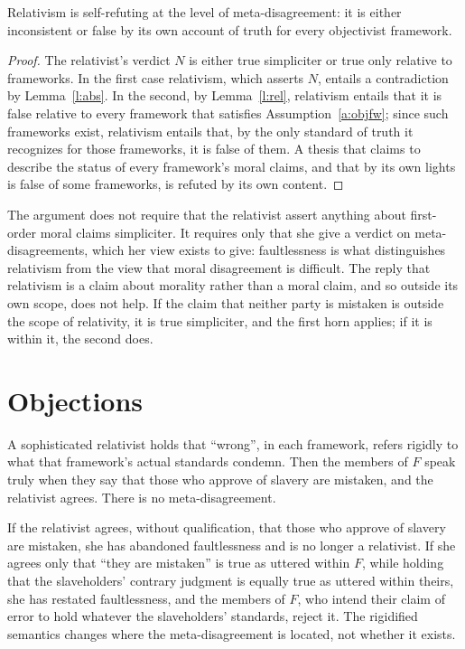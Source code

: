 \documentclass{situationist-preprint}
\begin{document}
\begin{theorem}\label{t:main}
Relativism is self-refuting at the level of meta-disagreement: it is either inconsistent or false by its own account of truth for every objectivist framework.
\end{theorem}

\begin{proof}
The relativist's verdict $N$ is either true simpliciter or true only relative to frameworks. In the first case relativism, which asserts $N$, entails a contradiction by Lemma~\ref{l:abs}. In the second, by Lemma~\ref{l:rel}, relativism entails that it is false relative to every framework that satisfies Assumption~\ref{a:objfw}; since such frameworks exist, relativism entails that, by the only standard of truth it recognizes for those frameworks, it is false of them. A thesis that claims to describe the status of every framework's moral claims, and that by its own lights is false of some frameworks, is refuted by its own content.
\end{proof}

The argument does not require that the relativist assert anything about first-order moral claims simpliciter. It requires only that she give a verdict on meta-disagreements, which her view exists to give: faultlessness is what distinguishes relativism from the view that moral disagreement is difficult. The reply that relativism is a claim about morality rather than a moral claim, and so outside its own scope, does not help. If the claim that neither party is mistaken is outside the scope of relativity, it is true simpliciter, and the first horn applies; if it is within it, the second does.

\section{Objections}

\begin{objection}
A sophisticated relativist holds that \enquote{wrong}, in each framework, refers rigidly to what that framework's actual standards condemn. Then the members of $F$ speak truly when they say that those who approve of slavery are mistaken, and the relativist agrees. There is no meta-disagreement.
\end{objection}

\begin{reply}
If the relativist agrees, without qualification, that those who approve of slavery are mistaken, she has abandoned faultlessness and is no longer a relativist. If she agrees only that \enquote{they are mistaken} is true as uttered within $F$, while holding that the slaveholders' contrary judgment is equally true as uttered within theirs, she has restated faultlessness, and the members of $F$, who intend their claim of error to hold whatever the slaveholders' standards, reject it. The rigidified semantics changes where the meta-disagreement is located, not whether it exists.
\end{reply}
\end{document}
